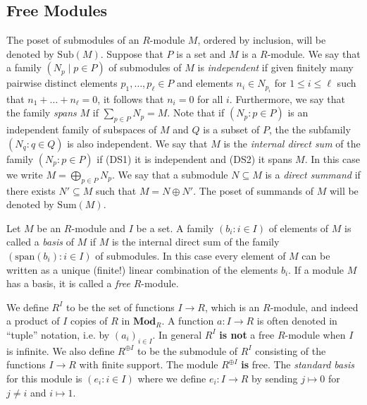 \documentclass[oneside,11pt]{amsart}
\newcommand{\bMod}{\ensuremath{\textbf{Mod}}}
\newcommand{\Sum}{\ensuremath{\text{Sum}}}
\newcommand{\Sub}{\ensuremath{\text{Sub}}}
\newcommand{\Span}{\ensuremath{\text{span}}}
\theoremstyle{definition}
\newtheorem{proof techniques}{Proof Techniques}
\begin{document}

\subsection{Free Modules}

The poset of submodules of an $R$-module $M$, ordered by inclusion, will be denoted by $\Sub(M)$. Suppose that $P$ is a set and $M$ is a $R$-module. We say that a family $(N_p \mid p \in P)$ of submodules of $M$ is \emph{independent} if given finitely many pairwise distinct elements $p_1, \ldots, p_\ell \in P$ and elements $n_i \in N_{p_i}$ for $1 \leq i \leq \ell$ such that $n_1 + \ldots + n_\ell = 0$, it follows that $n_i = 0$ for all $i$. Furthermore, we say that the family \emph{spans} $M$ if $\sum_{p \in P} N_p = M$. Note that if $(N_p : p \in P)$ is an independent family of subspaces of $M$ and $Q$ is a subset of $P$, the the subfamily $(N_q : q \in Q)$ is also independent. We say that $M$ is the \emph{internal direct sum} of the family $(N_p : p \in P)$ if (DS1) it is independent and (DS2) it spans $M$. In this case we write $M = \bigoplus_{p \in P} N_p$. We say that a submodule $N \subseteq M$ is a \emph{direct summand} if there exists $N' \subseteq M$ such that $M = N \oplus N'$. The poset of summands of $M$ will be denoted by $\Sum(M)$. 

Let $M$ be an $R$-module and $I$ be a set. A family $(b_i : i \in I)$ of elements of $M$ is called a \emph{basis} of $M$ if $M$ is the internal direct sum of the family $(\Span(b_i) : i \in I)$ of submodules. In this case every element of $M$ can be written as a unique (finite!) linear combination of the elements $b_i$. If a module $M$ has a basis, it is called a \emph{free} $R$-module.

We define $R^I$ to be the set of functions $I \to R$, which is an $R$-module, and indeed a product of $I$ copies of $R$ in $\bMod_R$. A function $a : I \to R$ is often denoted in ``tuple'' notation, i.e. by $(a_i)_{i \in I}$. In general $R^I$ \textbf{is not} a free $R$-module when $I$ is infinite. We also define $R^{\oplus I}$ to be the submodule of $R^I$ consisting of the functions $I \to R$ with finite support. The module $R^{\oplus I}$ \textbf{is} free. The \emph{standard basis} for this module is $(e_i : i \in I )$ where we define $e_i : I \to R$ by sending $j \mapsto 0$ for $j \neq i$ and $i \mapsto 1$. 
\end{document}
